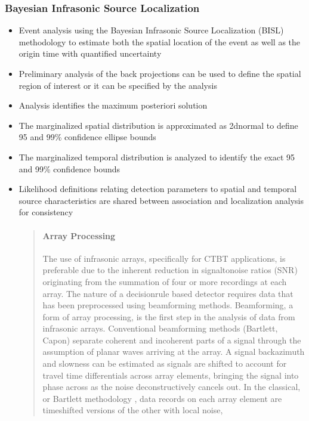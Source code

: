 \documentclass[letterpaper,10pt,english]{sphinxmanual}
\begin{document}
\subsubsection{Bayesian Infrasonic Source Localization}
\label{\detokenize{algorithms:localization}}\begin{itemize}
\item {} 
Event analysis using the Bayesian Infrasonic Source Localization (BISL) methodology to estimate both the spatial location of the event as well as the origin time with quantified uncertainty

\item {} 
Preliminary analysis of the back projections can be used to define the spatial region of interest or it can be specified by the analysis

\item {} 
Analysis identifies the maximum posteriori solution

\item {} 
The marginalized spatial distribution is approximated as 2d\sphinxhyphen{}normal to define 95 and 99\% confidence ellipse bounds

\item {} 
The marginalized temporal distribution is analyzed to identify the exact 95 and 99\% confidence bounds

\item {} 
Likelihood definitions relating detection parameters to spatial and temporal source characteristics are shared between association and localization analysis for consistency
\begin{quote}


\paragraph{Array Processing}
\label{\detokenize{beamforming:array-processing}}\label{\detokenize{beamforming:beamforming}}\label{\detokenize{beamforming::doc}}
The use of infrasonic arrays, specifically for CTBT applications, is preferable due to the inherent reduction in signal\sphinxhyphen{}to\sphinxhyphen{}noise ratios (SNR) originating from the summation of four or more recordings at each array. The nature of a decision\sphinxhyphen{}rule based detector requires data that has been pre\sphinxhyphen{}processed using beamforming methods. Beamforming, a form of array processing, is the first step in the analysis of data from infrasonic arrays.    Conventional beamforming methods (Bartlett, Capon) separate coherent and incoherent parts of a signal through the assumption of planar waves arriving at the array.  A signal backazimuth and slowness can be estimated as signals are shifted to account for travel time differentials across array elements, bringing the signal into phase across as the noise deconstructively cancels out.  In the classical, or Bartlett methodology , data records on each array element are time\sphinxhyphen{}shifted versions of the other with local noise,


\end{quote}
\end{itemize}
\end{document}
